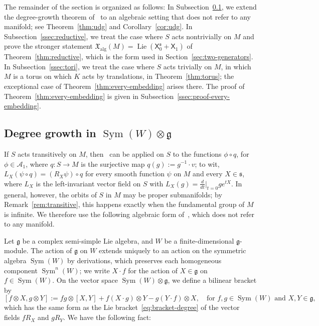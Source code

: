 \documentclass{article}
\newcommand{\frakg}{\mathfrak{g}}
\newcommand{\fraks}{\mathfrak{s}}
\newcommand{\xalg}{\mathfrak X_{\mathrm{alg}}}
\newcommand{\sX}{\mathsf{X}}
\newcommand{\Sym}{\operatorname{Sym}}
\theoremstyle{definition}
\theoremstyle{plain}
\begin{document}
The remainder of the section is organized as follows:
In Subsection~\ref{ssec:algebroid}, we extend the degree-growth theorem of~\cite{CofD3gen} to an algebraic setting that does not refer to any manifold; see Theorem~\ref{thm:udg} and Corollary~\ref{cor:udg}.
In Subsection~\ref{ssec:reductive}, we treat the case where $S$ acts nontrivially on $M$ and prove the stronger statement $\xalg(M)=\operatorname{Lie}(\sX_0^{\fraks}+\sX_1)$ of Theorem~\ref{thm:reductive}, which is the form used in Section~\ref{sec:two-generators}.
In Subsection~\ref{ssec:tori}, we treat the case where $S$ acts trivially on $M$, in which $M$ is a torus on which $K$ acts by translations, in Theorem~\ref{thm:torus}; the exceptional case of Theorem~\ref{thm:every-embedding} arises there.
The proof of Theorem~\ref{thm:every-embedding} is given in Subsection~\ref{ssec:proof-every-embedding}.


\subsection{Degree growth in \texorpdfstring{$\Sym(W)\otimes\frakg$}{Sym(W)\textotimes g}}\label{ssec:algebroid}


If $S$ acts transitively on $M$, then~\cite[Theorem~1]{CofD3gen} can be applied on $S$ to the functions $\phi\circ q$, for $\phi\in\mathcal A_1$, where $q\colon S\to M$ is the surjective map $q(g):=g^{-1}\cdot v$; to wit,
    $L_X(\psi\circ q)=(R_X\psi)\circ q$ for every smooth function $\psi$ on $M$ and every $X\in\fraks$, where $L_X$ is the left-invariant vector field on $S$ with $L_X(g)=\frac{d}{dt}\big|_{t=0}ge^{tX}$.
In general, however, the orbits of $S$ in $M$ may be proper submanifolds; by Remark~\ref{rem:transitive},
this happens exactly when the fundamental group of $M$ is infinite.
We therefore use the following algebraic form of~\cite[Theorem~1]{CofD3gen}, which does not refer to any manifold.

Let $\frakg$ be a complex semi-simple Lie algebra, and $W$ be a finite-dimensional $\frakg$-module.
The action of $\frakg$ on $W$ extends uniquely to an action on the symmetric algebra $\Sym(W)$ by derivations, which preserves each homogeneous component $\Sym^n(W)$; we write $X\cdot f$ for the action of $X\in\frakg$ on $f\in\Sym(W)$.
On the vector space $\Sym(W)\otimes\frakg$, we define a bilinear bracket by
\begin{equation}\label{eq:algebroid-bracket}
[f\otimes X,g\otimes Y]:= fg\otimes[X,Y]+f(X\cdot g)\otimes Y-g(Y\cdot f)\otimes X,
\quad\mbox{for } f,g\in\Sym(W)\mbox{ and }X,Y\in\frakg,
\end{equation}
which has the same form as the Lie bracket~\eqref{eq:bracket-degree} of the vector fields $fR_X$ and $gR_Y$.
We have the following fact:
\end{document}
